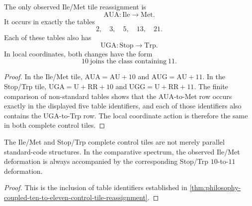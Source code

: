 \begin{theorem}
\label{thm:philosophy-coupled-ten-to-eleven-control-tile-reassignment}
The only observed Ile/Met tile reassignment is
$$
  \mathrm{AUA}:\mathrm{Ile}\to\mathrm{Met}.
$$
It occurs in exactly the tables
$$
  2,\quad 3,\quad 5,\quad 13,\quad 21.
$$
Each of these tables also has
$$
  \mathrm{UGA}:\mathrm{Stop}\to\mathrm{Trp}.
$$
In local coordinates, both changes have the form
$$
  10\ \text{joins the class containing}\ 11.
$$
\end{theorem}
\begin{proof}
In the Ile/Met tile, $\mathrm{AUA}=\mathrm{AU}+10$ and
$\mathrm{AUG}=\mathrm{AU}+11$. In the Stop/Trp tile,
$\mathrm{UGA}=\mathrm{U}+\mathrm{RR}+10$ and
$\mathrm{UGG}=\mathrm{U}+\mathrm{RR}+11$. The finite comparison of
non-standard tables shows that the AUA-to-Met row occurs exactly in the
displayed five table identifiers, and each of those identifiers also
contains the UGA-to-Trp row. The local coordinate action is therefore
the same in both complete control tiles.
\end{proof}

\begin{corollary}
\label{cor:philosophy-dual-control-tiles-coupled-variation}
The Ile/Met and Stop/Trp complete control tiles are not merely parallel
standard-code structures. In the comparative spectrum, the observed
Ile/Met deformation is always accompanied by the corresponding
Stop/Trp $10$-to-$11$ deformation.
\end{corollary}
\begin{proof}
This is the inclusion of table identifiers established in
\autoref{thm:philosophy-coupled-ten-to-eleven-control-tile-reassignment}.
\end{proof}

